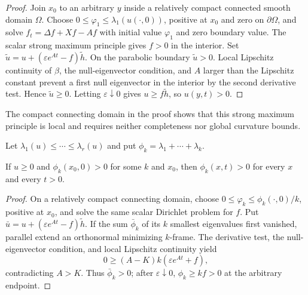 \begin{proof}
Join $x_0$ to an arbitrary $y$ inside a relatively compact connected smooth
domain $\Omega$.  Choose $0\leq\varphi_1\leq\lambda_1(u(\cdot,0))$, positive
at $x_0$ and zero on $\partial\Omega$, and solve
$f_t=\Delta f+Xf-Af$ with initial value $\varphi_1$ and zero boundary value.
The scalar strong maximum principle gives $f>0$ in the interior.  Set
$\widetilde u=u+(\varepsilon e^{At}-f)\widetilde h$.  On the parabolic
boundary $\widetilde u>0$.  Local Lipschitz continuity of $\beta$, the
null-eigenvector condition, and $A$ larger than the Lipschitz constant prevent
a first null eigenvector in the interior by the second derivative test.
Hence $\widetilde u\geq0$.  Letting $\varepsilon\downarrow0$ gives
$u\geq f\widetilde h$, so $u(y,t)>0$.
\end{proof}

\begin{remark}
\label{rem:system-strong-maximum-principle-locality}
The compact connecting domain in the proof shows that this strong maximum
principle is local and requires neither completeness nor global curvature
bounds.
\end{remark}

Let $\lambda_1(u)\leq\cdots\leq\lambda_r(u)$ and put
$\phi_k=\lambda_1+\cdots+\lambda_k$.

\begin{proposition}
\label{prop:system-strong-maximum-principle-eigenvalue-sums}
If $u\geq0$ and $\phi_k(x_0,0)>0$ for some $k$ and $x_0$, then
$\phi_k(x,t)>0$ for every $x$ and every $t>0$.
\end{proposition}

\begin{proof}
On a relatively compact connecting domain, choose
$0\leq\varphi_k\leq\phi_k(\cdot,0)/k$, positive at $x_0$, and solve the same
scalar Dirichlet problem for $f$.  Put
$\bar u=u+(\varepsilon e^{At}-f)\widetilde h$.  If the sum $\bar\phi_k$ of
its $k$ smallest eigenvalues first vanished, parallel extend an orthonormal
minimizing $k$-frame.  The derivative test, the null-eigenvector condition,
and local Lipschitz continuity yield
\[
0\geq (A-K)k(\varepsilon e^{At}+f),
\]
contradicting $A>K$.  Thus $\bar\phi_k>0$; after
$\varepsilon\downarrow0$, $\phi_k\geq kf>0$ at the arbitrary endpoint.
\end{proof}

